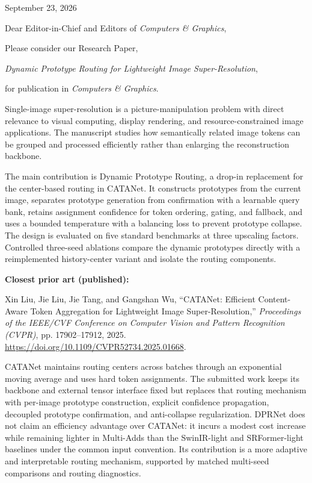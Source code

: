 \documentclass[10pt]{article}
\begin{document}
\begin{flushright}
September 23, 2026
\end{flushright}

Dear Editor-in-Chief and Editors of \emph{Computers \& Graphics},

Please consider our Research Paper,
\begin{center}
\emph{Dynamic Prototype Routing for Lightweight Image Super-Resolution},
\end{center}
for publication in \emph{Computers \& Graphics}.

Single-image super-resolution is a picture-manipulation problem with direct
relevance to visual computing, display rendering, and resource-constrained image
applications. The manuscript studies how semantically related image tokens can
be grouped and processed efficiently rather than enlarging the reconstruction
backbone.

The main contribution is Dynamic Prototype Routing, a drop-in replacement for
the center-based routing in CATANet. It constructs prototypes from the current
image, separates prototype generation from confirmation with a learnable query
bank, retains assignment confidence for token ordering, gating, and fallback,
and uses a bounded temperature with a balancing loss to prevent prototype
collapse. The design is evaluated on five standard benchmarks at three
upscaling factors. Controlled three-seed ablations compare the dynamic
prototypes directly with a reimplemented history-center variant and isolate the
routing components.

\textbf{Closest prior art (published):}

Xin Liu, Jie Liu, Jie Tang, and Gangshan Wu, ``CATANet: Efficient
Content-Aware Token Aggregation for Lightweight Image Super-Resolution,''
\emph{Proceedings of the IEEE/CVF Conference on Computer Vision and Pattern
Recognition (CVPR)}, pp. 17902--17912, 2025.
\url{https://doi.org/10.1109/CVPR52734.2025.01668}.

CATANet maintains routing centers across batches through an exponential moving
average and uses hard token assignments. The submitted work keeps its backbone
and external tensor interface fixed but replaces that routing mechanism with
per-image prototype construction, explicit confidence propagation, decoupled
prototype confirmation, and anti-collapse regularization. DPRNet does not claim
an efficiency advantage over CATANet: it incurs a modest cost increase while
remaining lighter in Multi-Adds than the SwinIR-light and SRFormer-light
baselines under the common input convention. Its contribution is a more
adaptive and interpretable routing mechanism, supported by matched multi-seed
comparisons and routing diagnostics.
\end{document}
